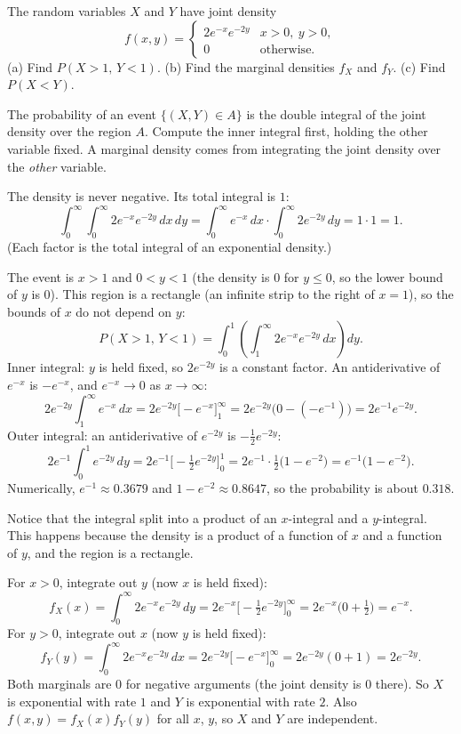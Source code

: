 
\begin{problem}
	The random variables $X$ and $Y$ have joint density
	\[
		f(x,y)=\begin{cases}
			2e^{-x}e^{-2y} & x>0,\ y>0, \\
			0              & \text{otherwise.}
		\end{cases}
	\]
	(a) Find $P(X>1,\,Y<1)$.
	(b) Find the marginal densities $f_X$ and $f_Y$.
	(c) Find $P(X<Y)$.
\end{problem}

\begin{solution}
	\idea The probability of an event $\{(X,Y)\in A\}$ is the double integral
	of the joint density over the region $A$. Compute the inner integral first,
	holding the other variable fixed. A marginal density comes from integrating
	the joint density over the \emph{other} variable.

	 The density is never negative. Its total integral is $1$:
	\[
		\int_0^\infty\!\!\int_0^\infty 2e^{-x}e^{-2y}\,dx\,dy
		=\int_0^\infty e^{-x}\,dx\cdot\int_0^\infty 2e^{-2y}\,dy
		=1\cdot 1=1.
	\]
	(Each factor is the total integral of an exponential density.)

	 The event is $x>1$ and $0<y<1$ (the density is $0$ for
	$y\le0$, so the lower bound of $y$ is $0$). This region is a rectangle
	(an infinite strip to the right of $x=1$), so the bounds of $x$ do not
	depend on $y$:
	\[
		P(X>1,\,Y<1)=\int_0^1\left(\int_1^\infty 2e^{-x}e^{-2y}\,dx\right)dy.
	\]
	Inner integral: $y$ is held fixed, so $2e^{-2y}$ is a constant factor.
	An antiderivative of $e^{-x}$ is $-e^{-x}$, and $e^{-x}\to0$ as
	$x\to\infty$:
	\[
		2e^{-2y}\int_1^\infty e^{-x}\,dx
		=2e^{-2y}\Big[-e^{-x}\Big]_1^\infty
		=2e^{-2y}\big(0-(-e^{-1})\big)
		=2e^{-1}e^{-2y}.
	\]
	Outer integral: an antiderivative of $e^{-2y}$ is $-\frac12e^{-2y}$:
	\[
		2e^{-1}\int_0^1 e^{-2y}\,dy
		=2e^{-1}\Big[-\tfrac12e^{-2y}\Big]_0^1
		=2e^{-1}\cdot\tfrac12\big(1-e^{-2}\big)
		=e^{-1}\big(1-e^{-2}\big).
	\]
	Numerically, $e^{-1}\approx0.3679$ and $1-e^{-2}\approx0.8647$, so the
	probability is about $0.318$.

	Notice that the integral split into a product of an $x$-integral and a
	$y$-integral. This happens because the density is a product of a function
	of $x$ and a function of $y$, and the region is a rectangle.

	 For $x>0$, integrate out $y$ (now $x$ is held fixed):
	\[
		f_X(x)=\int_0^\infty 2e^{-x}e^{-2y}\,dy
		=2e^{-x}\Big[-\tfrac12e^{-2y}\Big]_0^\infty
		=2e^{-x}\big(0+\tfrac12\big)
		=e^{-x}.
	\]
	For $y>0$, integrate out $x$ (now $y$ is held fixed):
	\[
		f_Y(y)=\int_0^\infty 2e^{-x}e^{-2y}\,dx
		=2e^{-2y}\Big[-e^{-x}\Big]_0^\infty
		=2e^{-2y}(0+1)
		=2e^{-2y}.
	\]
	Both marginals are $0$ for negative arguments (the joint density is $0$
	there). So $X$ is exponential with rate $1$ and $Y$ is exponential with
	rate $2$. Also $f(x,y)=f_X(x)f_Y(y)$ for all $x$, $y$, so $X$ and $Y$
	are independent.


\end{solution}
